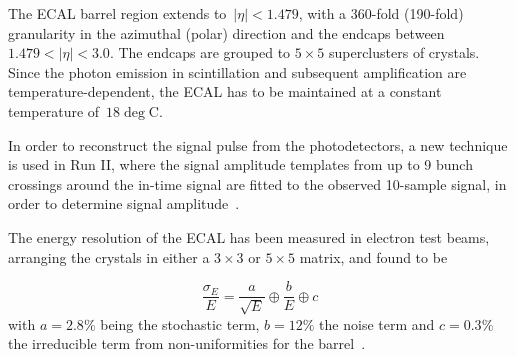 The ECAL barrel region extends to~$|\eta| < 1.479$, with a 360-fold (190-fold) granularity in the azimuthal (polar) direction and the endcaps between~$1.479 < |\eta| < 3.0$. The endcaps are grouped to $5\times5$ superclusters of crystals. Since the photon emission in scintillation and subsequent amplification are temperature-dependent, the ECAL has to be maintained at a constant temperature of~$18\deg \mathrm{C}$.

In order to reconstruct the signal pulse from the photodetectors, a new technique is used in Run II, where the signal amplitude templates from up to 9 bunch crossings around the in-time signal are fitted to the observed 10-sample signal, in order to determine signal amplitude~\cite{Brianza:2017slq}.

The energy resolution of the ECAL has been measured in electron test beams, arranging the crystals in either a $3\times3$ or $5\times5$ matrix, and found to be

\begin{equation}
\frac{\sigma_E}{E} = \frac{a}{\sqrt{E}} \oplus \frac{b}{E} \oplus c
\end{equation}
with $a = 2.8\%$ being the stochastic term, $b = 12\%$ the noise term and $c = 0.3\%$ the irreducible term from non-uniformities for the barrel~\cite{Adzic:2007mi}.